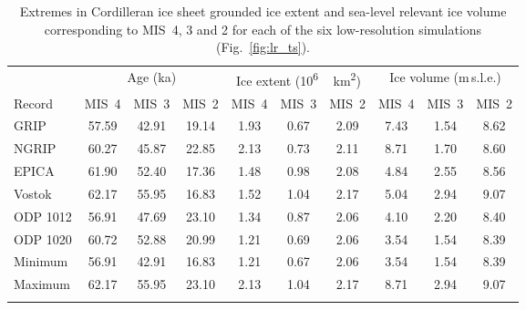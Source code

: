 \documentclass[tc, manuscript]{copernicus}
\begin{document}
\begin{table*}
\caption{%
      Extremes in Cordilleran ice sheet grounded ice extent and sea-level
      relevant ice volume corresponding to
      MIS~4, 3 and 2 for each of the six low-resolution simulations
      (Fig.~\ref{fig:lr_ts}).}
\label{tab:extrema}
{\begin{tabular}{l|ccc|ccc|ccc}
    \tophline
             & \multicolumn{3}{c|}{Age (ka)}
             & \multicolumn{3}{c|}{Ice extent (\unit{10^6\,km^2})}
             & \multicolumn{3}{c}{Ice volume (m\,s.l.e.)} \\
    Record   &  MIS~4 &  MIS~3 &  MIS~2
             &  MIS~4 &  MIS~3 &  MIS~2
             &  MIS~4 &  MIS~3 &  MIS~2 \\
    \middlehline
    GRIP     &  57.59 &  42.91 &  19.14
             &   1.93 &   0.67 &   2.09
             &   7.43 &   1.54 &   8.62 \\
    NGRIP    &  60.27 &  45.87 &  22.85
             &   2.13 &   0.73 &   2.11
             &   8.71 &   1.70 &   8.60 \\
    EPICA    &  61.90 &  52.40 &  17.36
             &   1.48 &   0.98 &   2.08
             &   4.84 &   2.55 &   8.56 \\
    Vostok   &  62.17 &  55.95 &  16.83
             &   1.52 &   1.04 &   2.17
             &   5.04 &   2.94 &   9.07 \\
    ODP 1012 &  56.91 &  47.69 &  23.10
             &   1.34 &   0.87 &   2.06
             &   4.10 &   2.20 &   8.40 \\
    ODP 1020 &  60.72 &  52.88 &  20.99
             &   1.21 &   0.69 &   2.06
             &   3.54 &   1.54 &   8.39 \\
    \cline{1-10}
    Minimum  &  56.91 &  42.91 &  16.83
             &   1.21 &   0.67 &   2.06
             &   3.54 &   1.54 &   8.39 \\
    Maximum  &  62.17 &  55.95 &  23.10
             &   2.13 &   1.04 &   2.17
             &   8.71 &   2.94 &   9.07 \\
    \bottomhline
\end{tabular}}
\end{table*}
\end{document}
